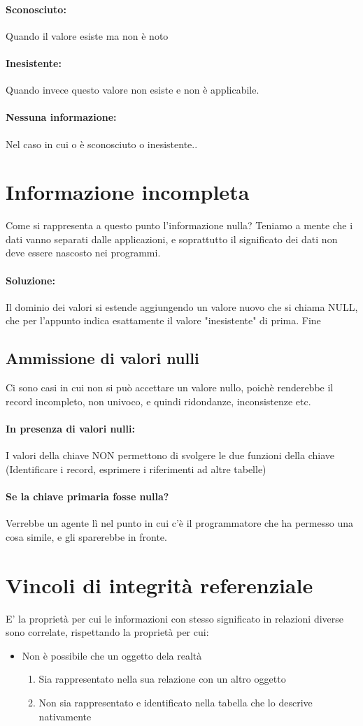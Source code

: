 \documentclass[12pt, a4paper, openany, twoside]{book}
\begin{document}
\paragraph{Sconosciuto:} Quando il valore esiste ma non è noto
\paragraph{Inesistente:} Quando invece questo valore non esiste e non è applicabile.
\paragraph{Nessuna informazione:} Nel caso in cui o è sconosciuto o inesistente..
\section{Informazione incompleta}
Come si rappresenta a questo punto l'informazione nulla? Teniamo a mente che i 
dati vanno separati dalle applicazioni, e soprattutto il significato dei dati non
deve essere nascosto nei programmi.
\paragraph{Soluzione:} Il dominio dei valori si estende aggiungendo un valore nuovo
che si chiama NULL, che per l'appunto indica esattamente il valore "inesistente"
di prima. Fine
\subsection{Ammissione di valori nulli}
Ci sono casi in cui non si può accettare un valore nullo, poichè renderebbe il 
record incompleto, non univoco, e quindi ridondanze, inconsistenze etc. 
\paragraph{In presenza di valori nulli:} I valori della chiave NON permettono
di svolgere le due funzioni della chiave (Identificare i record, esprimere i 
riferimenti ad altre tabelle)
\paragraph{Se la chiave primaria fosse nulla?} Verrebbe un agente lì nel punto in
cui c'è il programmatore che ha permesso una cosa simile, e gli sparerebbe in 
fronte.
\section{Vincoli di integrità referenziale}
E' la proprietà per cui le informazioni con stesso significato in relazioni 
diverse sono correlate, rispettando la proprietà per cui: 
\begin{itemize}
	\item Non è possibile che un oggetto dela realtà
    \begin{enumerate}
    	\item Sia rappresentato nella sua relazione con un altro oggetto
    	\item Non sia rappresentato e identificato nella tabella che lo 
    	descrive nativamente
    \end{enumerate}
\end{itemize}
\end{document}
